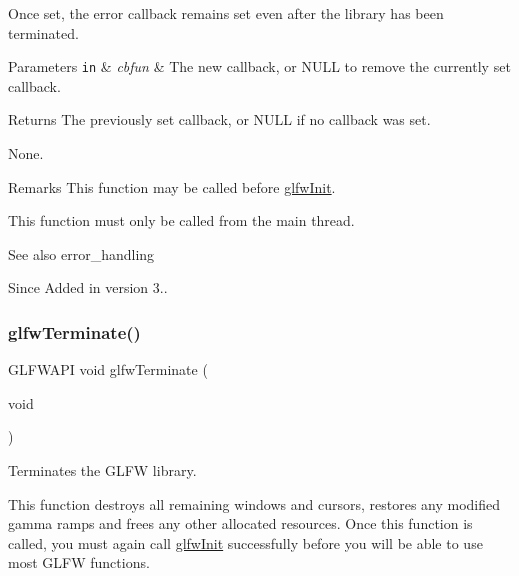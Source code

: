 Once set, the error callback remains set even after the library has been terminated.


\begin{DoxyParams}[1]{Parameters}
\mbox{\tt in}  & {\em cbfun} & The new callback, or {\ttfamily N\+U\+LL} to remove the currently set callback. \\
\hline
\end{DoxyParams}
\begin{DoxyReturn}{Returns}
The previously set callback, or {\ttfamily N\+U\+LL} if no callback was set.
\end{DoxyReturn}
None.

\begin{DoxyRemark}{Remarks}
This function may be called before \hyperlink{group__init_gab41771f0215a2e0afb4cf1cf98082d40}{glfw\+Init}.
\end{DoxyRemark}
This function must only be called from the main thread.

\begin{DoxySeeAlso}{See also}
error\+\_\+handling
\end{DoxySeeAlso}
\begin{DoxySince}{Since}
Added in version 3.. 
\end{DoxySince}
\mbox{\label{group__init_gafd90e6fd4819ea9e22e5e739519a6504}} 
\subsubsection{\texorpdfstring{glfw\+Terminate()}{glfwTerminate()}}
{\footnotesize\ttfamily G\+L\+F\+W\+A\+PI void glfw\+Terminate (\begin{DoxyParamCaption}\item[{void}]{ }\end{DoxyParamCaption})}



Terminates the G\+L\+FW library. 

This function destroys all remaining windows and cursors, restores any modified gamma ramps and frees any other allocated resources. Once this function is called, you must again call \hyperlink{group__init_gab41771f0215a2e0afb4cf1cf98082d40}{glfw\+Init} successfully before you will be able to use most G\+L\+FW functions.

